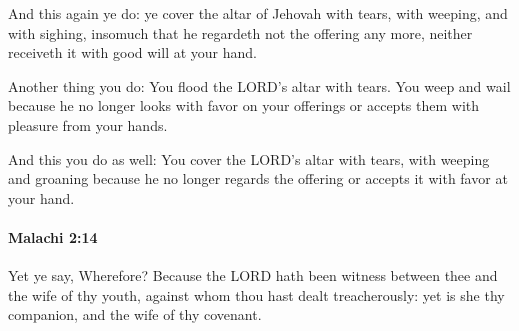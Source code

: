 			\begin{versebox}
					\item[BHS] 
					\item[LXX] 
					\item[ASV] And this again ye do: ye cover the altar of Jehovah with tears, with weeping, and with sighing, insomuch that he regardeth not the offering any more, neither receiveth it with good will at your hand.
					\item[NIV] Another thing you do: You flood the LORD’s altar with tears. You weep and wail because he no longer looks with favor on your offerings or accepts them with pleasure from your hands.
					\item[NRSV] And this you do as well: You cover the LORD’s altar with tears, with weeping and groaning because he no longer regards the offering or accepts it with favor at your hand.
			\end{versebox}

		\paragraph{Malachi 2:14} %
			\label{MALACHI-2-14}

			Yet ye say, Wherefore? Because the LORD hath been witness between thee and the wife of thy youth, against whom thou hast dealt treacherously: yet is she thy companion, and the wife of thy covenant.

